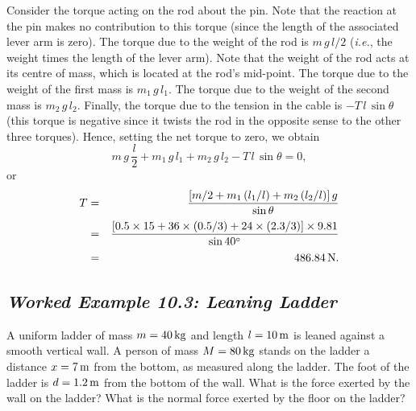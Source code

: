  Consider the torque acting on the rod about the pin. Note that the
reaction at the pin makes no contribution to this torque (since the
length of the associated lever arm is zero). 
The torque due to the
weight of the rod is $m\,g\,l/2$ ({\em i.e.}, the weight times the length of the lever arm).
Note that the weight of the rod acts at its centre of mass, which is located at the
rod's mid-point.
 The torque due to the weight of the first mass is
$m_1\,g\,l_1$.
 The torque due to the weight of the second mass is $m_2\,g\,l_2$. 
Finally, the torque due to the tension in the cable is $-T\,l\,\sin\theta$ (this
torque is negative since it  twists the rod in the opposite sense to the
other three torques).
Hence, setting the net torque to zero, we obtain
$$
m\,g\,\frac{l}{2} + m_1\,g\,l_1 + m_2\,g\,l_2 -T\,l\,\sin\theta = 0,
$$
or
\begin{eqnarray}
T &=& \frac{ [m/2 + m_1\,(l_1/l) + m_2\,(l_2/l)]\,g }{\sin\theta} \nonumber\\[0.5ex]
&=& \frac{[0.5\times 15 + 36\times(0.5/3)+24\times(2.3/3)]\times 9.81}{\sin 40^\circ}\nonumber\\[0.5ex]
 &=&
 486.84\,{\rm N}.\nonumber
\end{eqnarray}

\subsection*{\em Worked Example 10.3: Leaning Ladder}
 A uniform ladder of mass $m = 40\,{\rm kg}$ and length
$l=10\,{\rm m}$ is leaned against a smooth vertical wall. A person
of mass $M=80\,{\rm kg}$ stands on the ladder a distance  $x=7\,{\rm m}$
from the bottom, as measured along the ladder. The foot of the ladder
is $d=1.2\,{\rm m}$ from the bottom of the wall. What is the force exerted by the
wall on the ladder? What is the normal force exerted by the floor on the ladder?

\begin{figure*}[h]
\epsfysize=2.5in
\centerline{}
\end{figure*}

